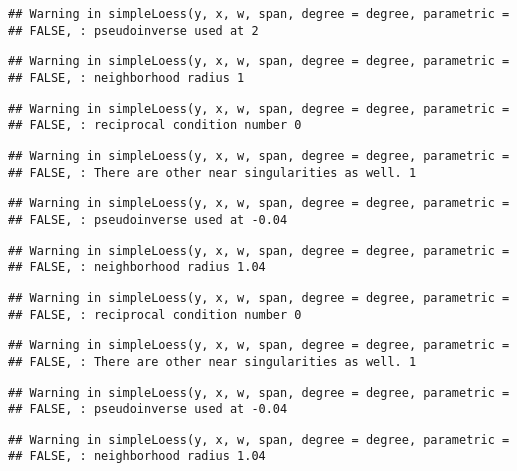 \documentclass[]{article}
\begin{document}
\begin{verbatim}
## Warning in simpleLoess(y, x, w, span, degree = degree, parametric =
## FALSE, : pseudoinverse used at 2
\end{verbatim}

\begin{verbatim}
## Warning in simpleLoess(y, x, w, span, degree = degree, parametric =
## FALSE, : neighborhood radius 1
\end{verbatim}

\begin{verbatim}
## Warning in simpleLoess(y, x, w, span, degree = degree, parametric =
## FALSE, : reciprocal condition number 0
\end{verbatim}

\begin{verbatim}
## Warning in simpleLoess(y, x, w, span, degree = degree, parametric =
## FALSE, : There are other near singularities as well. 1
\end{verbatim}

\begin{verbatim}
## Warning in simpleLoess(y, x, w, span, degree = degree, parametric =
## FALSE, : pseudoinverse used at -0.04
\end{verbatim}

\begin{verbatim}
## Warning in simpleLoess(y, x, w, span, degree = degree, parametric =
## FALSE, : neighborhood radius 1.04
\end{verbatim}

\begin{verbatim}
## Warning in simpleLoess(y, x, w, span, degree = degree, parametric =
## FALSE, : reciprocal condition number 0
\end{verbatim}

\begin{verbatim}
## Warning in simpleLoess(y, x, w, span, degree = degree, parametric =
## FALSE, : There are other near singularities as well. 1
\end{verbatim}

\begin{verbatim}
## Warning in simpleLoess(y, x, w, span, degree = degree, parametric =
## FALSE, : pseudoinverse used at -0.04
\end{verbatim}

\begin{verbatim}
## Warning in simpleLoess(y, x, w, span, degree = degree, parametric =
## FALSE, : neighborhood radius 1.04
\end{verbatim}
\end{document}
